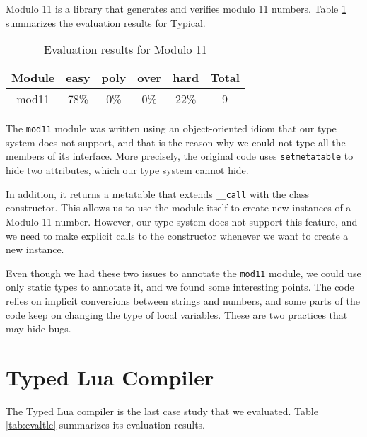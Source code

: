 Modulo 11 is a library that generates and verifies modulo 11 numbers.
Table \ref{tab:evalmod11} summarizes the evaluation results for Typical.

\begin{table}[!ht]
\begin{center}
\begin{tabular}{|c|c|c|c|c|c|}
\hline
\textbf{Module} & \textbf{easy} & \textbf{poly} & \textbf{over} & \textbf{hard} & \textbf{Total} \\
\hline
mod11 & 78\% & 0\% & 0\% & 22\% & 9 \\ %
\hline
\end{tabular}
\end{center}
\caption{Evaluation results for Modulo 11}
\label{tab:evalmod11}
\end{table}

The \texttt{mod11} module was written using an object-oriented idiom that
our type system does not support, and that is the reason why we could not
type all the members of its interface.
More precisely, the original code uses \texttt{setmetatable} to hide
two attributes, which our type system cannot hide.

In addition, it returns a metatable that extends \texttt{\string_\string_call}
with the class constructor.
This allows us to use the module itself to create new instances of a
Modulo 11 number.
However, our type system does not support this feature, and we need to
make explicit calls to the constructor whenever we want to create a
new instance.

Even though we had these two issues to annotate the \texttt{mod11} module,
we could use only static types to annotate it, and we found some interesting
points.
The code relies on implicit conversions between strings and numbers,
and some parts of the code keep on changing the type of local variables.
These are two practices that may hide bugs.

\section{Typed Lua Compiler}

The Typed Lua compiler is the last case study that we evaluated.
Table \ref{tab:evaltlc} summarizes its evaluation results.

